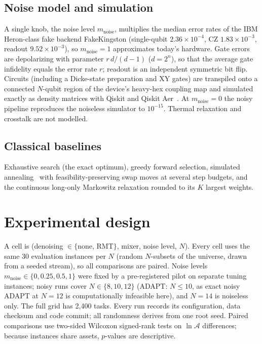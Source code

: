 \documentclass[11pt]{article}
\newcommand{\Amp}{\mathcal{A}}
\begin{document}
\subsection{Noise model and simulation}
A single knob, the noise level $m_{\mathrm{noise}}$, multiplies the median error rates of the IBM
Heron-class fake backend FakeKingston (single-qubit $2.36\times10^{-4}$, CZ $1.83\times10^{-3}$, readout
$9.52\times10^{-3}$), so $m_{\mathrm{noise}}=1$ approximates today's hardware. Gate errors are
depolarizing with parameter $r\,d/(d-1)$ ($d=2^n$), so that the average gate infidelity equals the
error rate $r$; readout is an independent symmetric bit flip. Circuits (including a Dicke-state
preparation and XY gates) are transpiled onto a connected $N$-qubit region of the device's
heavy-hex coupling map and simulated exactly as density matrices with Qiskit and Qiskit
Aer~\citep{javadiabhari2024qiskit}. At $m_{\mathrm{noise}}=0$ the noisy pipeline reproduces the
noiseless simulator to $10^{-15}$. Thermal relaxation and crosstalk are not modelled.

\subsection{Classical baselines}
Exhaustive search (the exact optimum), greedy forward selection, simulated annealing~\citep{kirkpatrick1983}
with feasibility-preserving swap moves at several step budgets, and the continuous long-only
Markowitz relaxation rounded to its $K$ largest weights.

\section{Experimental design}\label{sec:design}
A cell is (denoising $\in\{$none, RMT$\}$, mixer, noise level, $N$). Every cell uses the same 30
evaluation instances per $N$ (random $N$-subsets of the universe, drawn from a seeded stream),
so all comparisons are paired. Noise levels $m_{\mathrm{noise}}\in\{0,0.25,0.5,1\}$ were fixed by a
pre-registered pilot on separate tuning instances; noisy runs cover $N\in\{8,10,12\}$ (ADAPT:
$N\le10$, as exact noisy ADAPT at $N=12$ is computationally infeasible here), and $N=14$ is
noiseless only. The full grid has 2{,}400 tasks. Every run records its configuration, data
checksum and code commit; all randomness derives from one root seed. Paired comparisons use
two-sided Wilcoxon signed-rank tests on $\ln\Amp$ differences; because instances share assets,
$p$-values are descriptive.
\end{document}
